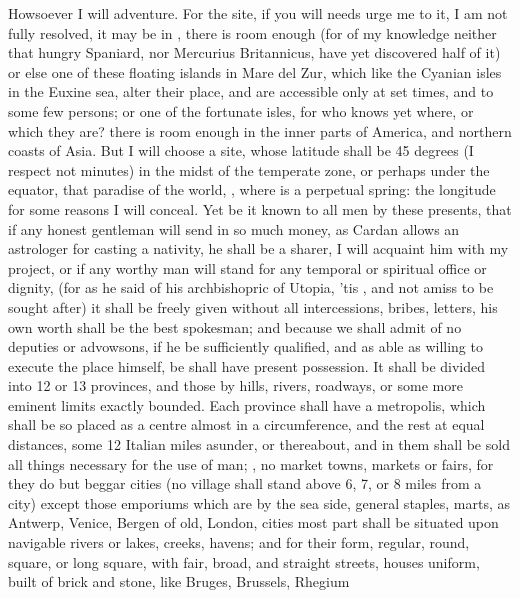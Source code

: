 Howsoever I will adventure. For the site, if you will needs urge me to
it, I am not fully resolved, it may be in ,
there is room enough (for of my knowledge neither that hungry Spaniard,
nor Mercurius Britannicus, have yet discovered half of it) or else
one of these floating islands in Mare del Zur, which like the Cyanian
isles in the Euxine sea, alter their place, and are accessible only at
set times, and to some few persons; or one of the fortunate isles, for
who knows yet where, or which they are? there is room enough in the
inner parts of America, and northern coasts of Asia. But I will choose
a site, whose latitude shall be 45 degrees (I respect not minutes) in
the midst of the temperate zone, or perhaps under the equator, that
paradise of the world, , \etc{} where is a
perpetual spring: the longitude for some reasons I will conceal. Yet be
it known to all men by these presents, that if any honest gentleman
will send in so much money, as Cardan allows an astrologer for casting
a nativity, he shall be a sharer, I will acquaint him with my project,
or if any worthy man will stand for any temporal or spiritual office or
dignity, (for as he said of his archbishopric of Utopia, 'tis , and not amiss to be sought after) it shall be freely given
without all intercessions, bribes, letters, \etc{} his own worth shall be
the best spokesman; and because we shall admit of no deputies or
advowsons, if he be sufficiently qualified, and as able as willing to
execute the place himself, be shall have present possession. It shall
be divided into 12 or 13 provinces, and those by hills, rivers,
roadways, or some more eminent limits exactly bounded. Each province
shall have a metropolis, which shall be so placed as a centre almost in
a circumference, and the rest at equal distances, some 12 Italian miles
asunder, or thereabout, and in them shall be sold all things necessary
for the use of man; , no market towns, markets or
fairs, for they do but beggar cities (no village shall stand above 6,
7, or 8 miles from a city) except those emporiums which are by the sea
side, general staples, marts, as Antwerp, Venice, Bergen of old,
London, \etc{} cities most part shall be situated upon navigable rivers or
lakes, creeks, havens; and for their form, regular, round, square, or
long square, with fair, broad, and straight streets, houses
uniform, built of brick and stone, like Bruges, Brussels, Rhegium
